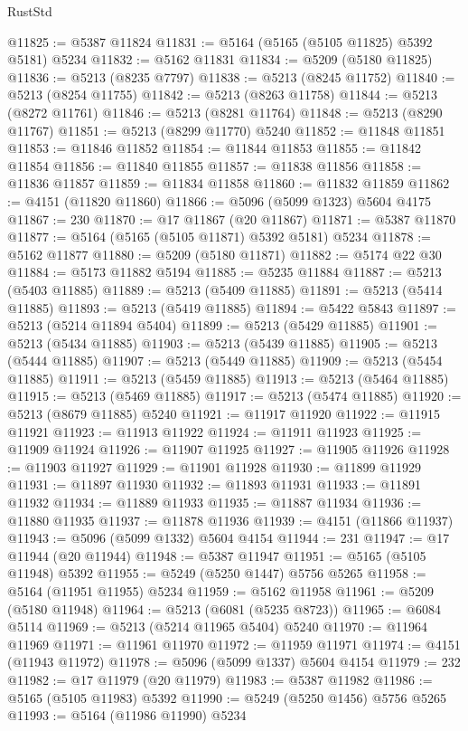 \begin{lexlean}{RustStd}
\begin{coremodule}
@11825 := @5387 @11824
@11831 := @5164 (@5165 (@5105 @11825) @5392 @5181) @5234
@11832 := @5162 @11831
@11834 := @5209 (@5180 @11825)
@11836 := @5213 (@8235 @7797)
@11838 := @5213 (@8245 @11752)
@11840 := @5213 (@8254 @11755)
@11842 := @5213 (@8263 @11758)
@11844 := @5213 (@8272 @11761)
@11846 := @5213 (@8281 @11764)
@11848 := @5213 (@8290 @11767)
@11851 := @5213 (@8299 @11770) @5240
@11852 := @11848 @11851
@11853 := @11846 @11852
@11854 := @11844 @11853
@11855 := @11842 @11854
@11856 := @11840 @11855
@11857 := @11838 @11856
@11858 := @11836 @11857
@11859 := @11834 @11858
@11860 := @11832 @11859
@11862 := @4151 (@11820 @11860)
@11866 := @5096 (@5099 @1323) @5604 @4175
@11867 := 230
@11870 := @17 @11867 (@20 @11867)
@11871 := @5387 @11870
@11877 := @5164 (@5165 (@5105 @11871) @5392 @5181) @5234
@11878 := @5162 @11877
@11880 := @5209 (@5180 @11871)
@11882 := @5174 @22 @30
@11884 := @5173 @11882 @5194
@11885 := @5235 @11884
@11887 := @5213 (@5403 @11885)
@11889 := @5213 (@5409 @11885)
@11891 := @5213 (@5414 @11885)
@11893 := @5213 (@5419 @11885)
@11894 := @5422 @5843
@11897 := @5213 (@5214 @11894 @5404)
@11899 := @5213 (@5429 @11885)
@11901 := @5213 (@5434 @11885)
@11903 := @5213 (@5439 @11885)
@11905 := @5213 (@5444 @11885)
@11907 := @5213 (@5449 @11885)
@11909 := @5213 (@5454 @11885)
@11911 := @5213 (@5459 @11885)
@11913 := @5213 (@5464 @11885)
@11915 := @5213 (@5469 @11885)
@11917 := @5213 (@5474 @11885)
@11920 := @5213 (@8679 @11885) @5240
@11921 := @11917 @11920
@11922 := @11915 @11921
@11923 := @11913 @11922
@11924 := @11911 @11923
@11925 := @11909 @11924
@11926 := @11907 @11925
@11927 := @11905 @11926
@11928 := @11903 @11927
@11929 := @11901 @11928
@11930 := @11899 @11929
@11931 := @11897 @11930
@11932 := @11893 @11931
@11933 := @11891 @11932
@11934 := @11889 @11933
@11935 := @11887 @11934
@11936 := @11880 @11935
@11937 := @11878 @11936
@11939 := @4151 (@11866 @11937)
@11943 := @5096 (@5099 @1332) @5604 @4154
@11944 := 231
@11947 := @17 @11944 (@20 @11944)
@11948 := @5387 @11947
@11951 := @5165 (@5105 @11948) @5392
@11955 := @5249 (@5250 @1447) @5756 @5265
@11958 := @5164 (@11951 @11955) @5234
@11959 := @5162 @11958
@11961 := @5209 (@5180 @11948)
@11964 := @5213 (@6081 (@5235 @8723))
@11965 := @6084 @5114
@11969 := @5213 (@5214 @11965 @5404) @5240
@11970 := @11964 @11969
@11971 := @11961 @11970
@11972 := @11959 @11971
@11974 := @4151 (@11943 @11972)
@11978 := @5096 (@5099 @1337) @5604 @4154
@11979 := 232
@11982 := @17 @11979 (@20 @11979)
@11983 := @5387 @11982
@11986 := @5165 (@5105 @11983) @5392
@11990 := @5249 (@5250 @1456) @5756 @5265
@11993 := @5164 (@11986 @11990) @5234

\end{coremodule}
\end{lexlean}

